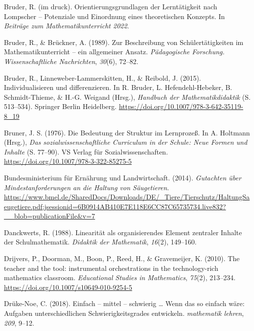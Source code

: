 \documentclass[
]{scrbook}
\newlength{\cslhangindent}
\newlength{\cslentryspacingunit} %
\newenvironment{CSLReferences}[2] %
 {%
  \setlength{\parindent}{0pt}
  \ifodd #1
  \let\oldpar\par
  \def\par{\hangindent=\cslhangindent\oldpar}
  \fi
  \setlength{\parskip}{#2\cslentryspacingunit}
 }%
 {}
\theoremstyle{definition}
\theoremstyle{definition}
\theoremstyle{definition}
\theoremstyle{definition}
\theoremstyle{remark}
\begin{document}
\begin{CSLReferences}{1}{0}
\leavevmode{}%
Bruder, R. (im {d}ruck). Orientierungsgrundlagen der {Lerntätigkeit} nach {Lompscher} -- {Potenziale} und {Einordnung} eines theoretischen {Konzepts}. In \emph{Beiträge zum {Mathematikunterricht} 2022}.

\leavevmode{}%
Bruder, R., \& Brückner, A. (1989). Zur {Beschreibung} von {Schülertätigkeiten} im {Mathematikunterricht} -- ein allgemeiner {Ansatz}. \emph{Pädagogische Forschung. Wissenschaftliche Nachrichten}, \emph{30}(6), 72--82.

\leavevmode{}%
Bruder, R., Linneweber-Lammerskitten, H., \& Reibold, J. (2015). Individualisieren und differenzieren. In R. Bruder, L. Hefendehl-Hebeker, B. Schmidt-Thieme, \& H.-G. Weigand (Hrsg.), \emph{Handbuch der {Mathematikdidaktik}} (S. 513--534). Springer Berlin Heidelberg. \url{https://doi.org/10.1007/978-3-642-35119-8_19}

\leavevmode{}%
Bruner, J. S. (1976). Die {Bedeutung} der {Struktur} im {Lernprozeß}. In A. Holtmann (Hrsg.), \emph{Das sozialwissenschaftliche {Curriculum} in der {Schule}: {Neue} {Formen} und {Inhalte}} (S. 77--90). VS Verlag für Sozialwissenschaften. \url{https://doi.org/10.1007/978-3-322-85275-5}

\leavevmode{}%
Bundesministerium für Ernährung und Landwirtschaft. (2014). \emph{Gutachten über {Mindestanforderungen} an die {Haltung} von {Säugetieren}}. \url{https://www.bmel.de/SharedDocs/Downloads/DE/_Tiere/Tierschutz/HaltungSaeugetiere.pdf;jsessionid=6B0914AB410E7E118E6CC87C65735734.live832?__blob=publicationFile\&v=7}

\leavevmode{}%
Danckwerts, R. (1988). Linearität als organisierendes Element zentraler Inhalte der Schulmathematik. \emph{Didaktik der Mathematik}, \emph{16}(2), 149--160.

\leavevmode{}%
Drijvers, P., Doorman, M., Boon, P., Reed, H., \& Gravemeijer, K. (2010). The teacher and the tool: instrumental orchestrations in the technology-rich mathematics classroom. \emph{Educational Studies in Mathematics}, \emph{75}(2), 213--234. \url{https://doi.org/10.1007/s10649-010-9254-5}

\leavevmode{}%
Drüke-Noe, C. (2018). Einfach -- mittel -- schwierig \ldots{} {Wenn} das so einfach wäre: {Aufgaben} unterschiedlichen {Schwierigkeitsgrades} entwickeln. \emph{mathematik lehren}, \emph{209}, 9--12.


\end{CSLReferences}
\end{document}
